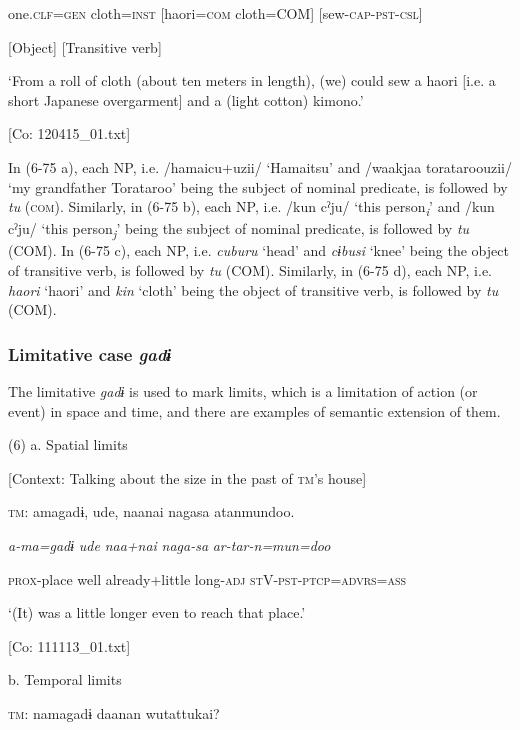       one.\textsc{clf}=\textsc{gen}  cloth=\textsc{inst}  [haori=\textsc{com}  cloth=COM]  [sew-\textsc{cap}-\textsc{pst}-\textsc{csl}]

          [Object]  [Transitive verb]

      ‘From a roll of cloth (about ten meters in length), (we) could sew a haori [i.e. a short Japanese overgarment] and a (light cotton) kimono.’

      [Co: 120415\_01.txt]

In (6-75 a), each NP, i.e. /hamaicu+uzii/ ‘Hamaitsu’ and /waakjaa torataroouzii/ ‘my grandfather Torataroo’ being the subject of nominal predicate, is followed by \textit{tu} (\textsc{com}). Similarly, in (6-75 b), each NP, i.e. /kun cˀju/ ‘this person\textit{\textsubscript{i}}’ and /kun cˀju/ ‘this person\textit{\textsubscript{j}}’ being the subject of nominal predicate, is followed by \textit{tu} (COM). In (6-75 c), each NP, i.e. \textit{cuburu} ‘head’ and \textit{cɨbusi} ‘knee’ being the object of transitive verb, is followed by \textit{tu} (COM). Similarly, in (6-75 d), each NP, i.e. \textit{haori} ‘haori’ and \textit{kin} ‘cloth’ being the object of transitive verb, is followed by \textit{tu} (COM).

\subsubsection{ Limitative case \textit{gadɨ}}

The limitative \textit{gadɨ} is used to mark limits, which is a limitation of action (or event) in space and time, and there are examples of semantic extension of them.

(6)  a. Spatial limits

  [Context: Talking about the size in the past of \textsc{tm}’s house]

  \textsc{tm}:  amagadɨ,  ude,  naanai  nagasa  atanmundoo.

    \textit{a-ma=gadɨ}  \textit{ude}  \textit{naa+nai}  \textit{naga-sa}  \textit{ar-tar-n=mun=doo}

    \textsc{prox}-place  well  already+little  long-\textsc{adj}  \textsc{st}V-\textsc{pst}-\textsc{ptcp}=\textsc{advrs}=\textsc{ass}

    ‘(It) was a little longer even to reach that place.’

    [Co: 111113\_01.txt]

  b. Temporal limits

  \textsc{tm}:  namagadɨ  daanan  wutattukai?

